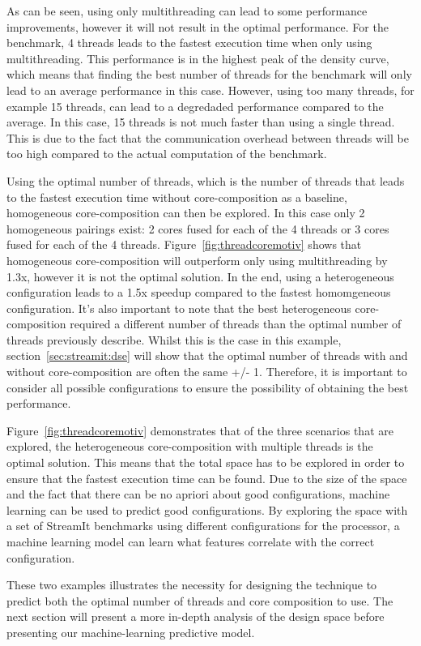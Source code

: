 As can be seen, using only multithreading can lead to some performance improvements, however it will not result in the optimal performance.
For the  benchmark, 4 threads leads to the fastest execution time when only using multithreading.
This performance is in the highest peak of the density curve, which means that finding the best number of threads for the benchmark will only lead to an average performance in this case.
However, using too many threads, for example 15 threads, can lead to a degredaded performance compared to the average.
In this case, 15 threads is not much faster than using a single thread.
This is due to the fact that the communication overhead between threads will be too high compared to the actual computation of the benchmark.

Using the optimal number of threads, which is the number of threads that leads to the fastest execution time without core-composition as a baseline, homogeneous core-composition can then be explored.
In this case only 2 homogeneous pairings exist: 2 cores fused for each of the 4 threads or 3 cores fused for each of the 4 threads.
Figure~\ref{fig:threadcoremotiv} shows that homogeneous core-composition will outperform only using multithreading by 1.3x, however it is not the optimal solution.
In the end, using a heterogeneous configuration leads to a 1.5x speedup compared to the fastest homomgeneous configuration.
It's also important to note that the best heterogeneous core-composition required a different number of threads than the optimal number of threads previously describe.
Whilst this is the case in this example, section~\ref{sec:streamit:dse} will show that the optimal number of threads with and without core-composition are often the same +/- 1.
Therefore, it is important to consider all possible configurations to ensure the possibility of obtaining the best performance.

Figure~\ref{fig:threadcoremotiv} demonstrates that of the three scenarios that are explored, the heterogeneous core-composition with multiple threads is the optimal solution.
This means that the total space has to be explored in order to ensure that the fastest execution time can be found.
Due to the size of the space and the fact that there can be no apriori about good configurations, machine learning can be used to predict good configurations.
By exploring the space with a set of StreamIt benchmarks using different configurations for the processor, a machine learning model can learn what features correlate with the correct configuration.

These two examples illustrates the necessity for designing the technique to predict both the optimal number of threads and core composition to use.
The next section will present a more in-depth analysis of the design space before presenting our machine-learning predictive model.

